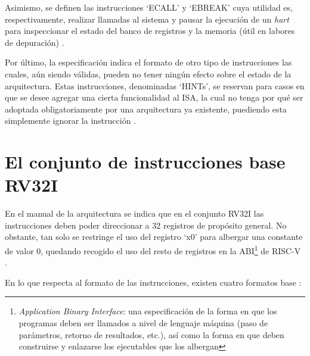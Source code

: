 Asimismo, se definen las instrucciones `ECALL'  y `EBREAK' cuya utilidad es, respectivamente, realizar llamadas al sistema y pausar la ejecución de un \textit{hart} para inspeccionar el estado del banco de registros y la memoria (útil en labores de depuración) \cite{riscv-unpriv-isa-20250508-unpriv-isa-ecall-ebreak}.

Por último, la especificación indica el formato de otro tipo de instrucciones las cuales, aún siendo válidas, pueden no tener ningún efecto sobre el estado de la arquitectura. Estas instrucciones, denominadas `HINTs', se reservan para casos en que se desee agregar una cierta funcionalidad al ISA, la cual no tenga por qué ser adoptada obligatoriamente por una arquitectura ya existente, puediendo esta simplemente ignorar la instrucción \cite{riscv-unpriv-isa-20250508-unpriv-isa-hint}.

\section{El conjunto de instrucciones base RV32I}

En el manual de la arquitectura se indica que en el conjunto RV32I las instrucciones deben poder direccionar a 32 registros de propósito general. No obstante, tan solo se restringe el uso del registro `x0' para albergar una constante de valor 0, quedando recogido el uso del resto de registros en la ABI\footnote{\textit{Application Binary Interface}: una especificación de la forma en que los programas deben ser llamados a nivel de lenguaje máquina (paso de parámetros, retorno de resultados, etc.), así como la forma en que deben construirse y enlazarse los ejecutables que los albergan} de RISC-V \cite{riscv-abi}.

En lo que respecta al formato de las instrucciones, existen cuatro formatos base \cite{riscv-unpriv-isa-20250508-unpriv-isa-base-instr-formats}:

